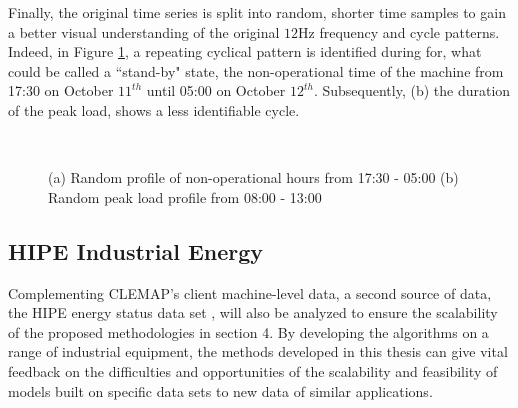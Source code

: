 Finally, the original time series is split into random, shorter time samples to gain a better visual understanding of the original $12$Hz frequency and cycle patterns. Indeed, in Figure \ref{fig:fig11}, a repeating cyclical pattern is identified during for, what could be called a ``stand-by" state, the non-operational time of the machine from 17:30 on October $11^{th}$ until 05:00 on October $12^{th}$. Subsequently, (b) the duration of the peak load, shows a less identifiable cycle. 

\begin{figure}[H]
    \centering
    \graphicspath{ {./images/} }
     \\
    \caption{(a) Random profile of non-operational hours from 17:30 - 05:00 (b) Random peak load profile from 08:00 - 13:00}
    \label{fig:fig11}
\end{figure}


\subsection{HIPE Industrial Energy}
Complementing CLEMAP's client machine-level data, a second source of data, the \ac{HIPE} energy status data set \cite{HIPE}, will also be analyzed to ensure the scalability of the proposed methodologies in section 4. By developing the algorithms on a range of industrial equipment, the methods developed in this thesis can give vital feedback on the difficulties and opportunities of the scalability and feasibility of models built on specific data sets to new data of similar applications. 


